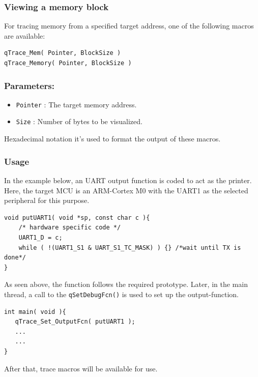 \documentclass{article}
\begin{document}
\subsubsection{Viewing a memory block}
For tracing memory from a specified target address, one of the following macros are available:  

\begin{lstlisting}[style=CStyle]
qTrace_Mem( Pointer, BlockSize )
qTrace_Memory( Pointer, BlockSize )
\end{lstlisting}

\subsubsection*{Parameters:}
\begin{itemize}
    \item \lstinline{Pointer} : The target memory address.
    \item \lstinline{Size} : Number of bytes to be visualized.
\end{itemize}

Hexadecimal notation it's used to format the output of these macros.

\subsubsection{Usage}

In the example below, an UART output function is coded to act as the printer. Here, the target MCU is an ARM-Cortex M0 with the UART1 as the selected peripheral for this purpose. \\

\begin{lstlisting}[style=CStyle]
void putUART1( void *sp, const char c ){
    /* hardware specific code */
    UART1_D = c;
    while ( !(UART1_S1 & UART_S1_TC_MASK) ) {} /*wait until TX is done*/ 
}
\end{lstlisting}  

As seen above, the function follows the required prototype. Later, in the main thread, a call to the \lstinline{qSetDebugFcn()} is used to set up the output-function.

\begin{lstlisting}[style=CStyle]
int main( void ){
   qTrace_Set_OutputFcn( putUART1 );
   ... 
   ...
}
\end{lstlisting}  

After that, trace macros will be available for use.
\end{document}
